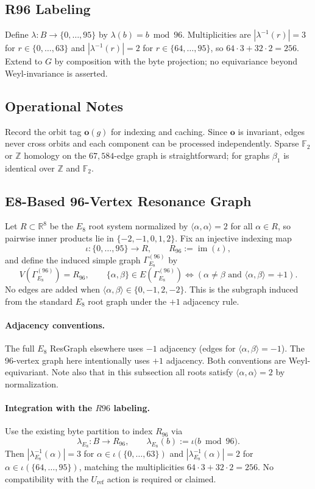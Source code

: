 \documentclass[12pt]{article}
\begin{document}
\subsection{R96 Labeling}
Define $\lambda:B\to\{0,\dots,95\}$ by $\lambda(b)=b\bmod 96$. Multiplicities are $|\lambda^{-1}(r)|=3$ for $r\in\{0,\dots,63\}$ and $|\lambda^{-1}(r)|=2$ for $r\in\{64,\dots,95\}$, so $64\cdot 3+32\cdot 2=256$. Extend to $G$ by composition with the byte projection; no equivariance beyond Weyl-invariance is asserted.

\subsection{Operational Notes}
Record the orbit tag $\mathbf o(g)$ for indexing and caching. Since $\mathbf o$ is invariant, edges never cross orbits and each component can be processed independently. Sparse $\mathbb F_2$ or $\mathbb Z$ homology on the $67{,}584$-edge graph is straightforward; for graphs $\beta_1$ is identical over $\mathbb Z$ and $\mathbb F_2$.

\subsection{E8-Based 96-Vertex Resonance Graph}
Let $R\subset\mathbb R^8$ be the $E_8$ root system normalized by $\langle\alpha,\alpha\rangle=2$ for all $\alpha\in R$, so pairwise inner products lie in $\{-2,-1,0,1,2\}$. Fix an injective indexing map
\[
\iota:\{0,\dots,95\}\longrightarrow R,\qquad R_{96}:=\operatorname{im}(\iota),
\]
and define the induced simple graph $\Gamma_{E_8}^{(96)}$ by
\[
V(\Gamma_{E_8}^{(96)})=R_{96},\qquad \{\alpha,\beta\}\in E(\Gamma_{E_8}^{(96)})\iff (\alpha\neq\beta\text{ and }\langle\alpha,\beta\rangle=+1).
\]
No edges are added when $\langle\alpha,\beta\rangle\in\{0,-1,2,-2\}$. This is the subgraph induced from the standard $E_8$ root graph under the $+1$ adjacency rule.

\paragraph{Adjacency conventions.} The full $E_8$ ResGraph elsewhere uses $-1$ adjacency (edges for $\langle\alpha,\beta\rangle=-1$). The 96-vertex graph here intentionally uses $+1$ adjacency. Both conventions are Weyl-equivariant. Note also that in this subsection all roots satisfy $\langle\alpha,\alpha\rangle=2$ by normalization.

\paragraph{Integration with the $R96$ labeling.} Use the existing byte partition to index $R_{96}$ via
\[
\lambda_{E_8}:B\to R_{96},\qquad \lambda_{E_8}(b):=\iota\big(b\bmod 96\big).
\]
Then $|\lambda_{E_8}^{-1}(\alpha)|=3$ for $\alpha\in\iota(\{0,\dots,63\})$ and $|\lambda_{E_8}^{-1}(\alpha)|=2$ for $\alpha\in\iota(\{64,\dots,95\})$, matching the multiplicities $64\cdot3+32\cdot2=256$. No compatibility with the $U_{\mathrm{ref}}$ action is required or claimed.
\end{document}
